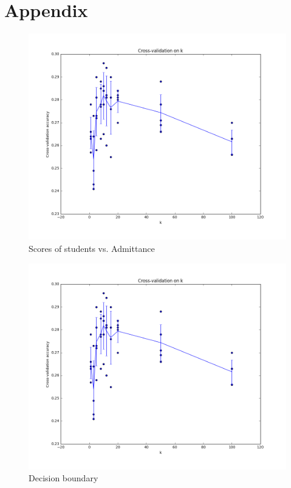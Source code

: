 \documentclass[pdftex,11pt]{article}
\begin{document}
\pagebreak
\section*{Appendix}
\begin{figure}[H]
  \caption{Scores of students vs. Admittance}
  \centering
    \includegraphics[scale=0.5]{fig1.png}
\end{figure}
\begin{figure}[H]
  \caption{Decision boundary}
  \label{fig:linfit}
  \centering
    \includegraphics[scale=0.5]{fig1.png}
\end{figure}
\end{document}
